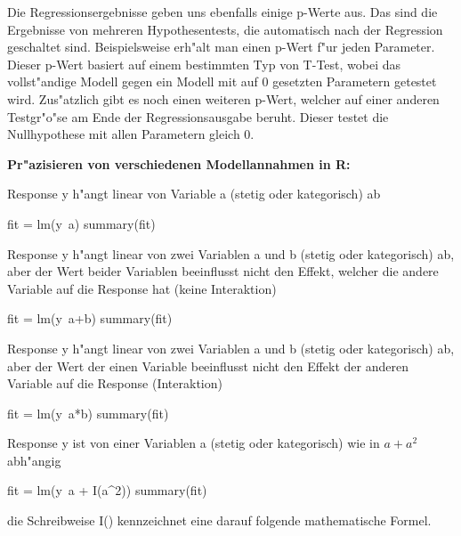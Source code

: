 \documentclass[a4paper,twoside]{tufte-book}\usepackage[]{graphicx}\usepackage[]{color}
\begin{document}
Die Regressionsergebnisse geben uns ebenfalls einige p-Werte aus. Das sind die Ergebnisse von mehreren Hypothesentests, die automatisch nach der Regression geschaltet sind. Beispielsweise erh"alt man einen p-Wert f"ur jeden Parameter. Dieser p-Wert basiert auf einem bestimmten Typ von T-Test, wobei das vollst"andige Modell gegen ein Modell mit auf 0 gesetzten Parametern getestet wird. Zus"atzlich gibt es noch einen weiteren p-Wert, welcher auf einer anderen Testgr"o"se am Ende der Regressionsausgabe beruht. Dieser testet die Nullhypothese mit allen Parametern gleich 0.

\vspace{1cm}
\begin{fullwidth}
\begin{mdframed}
    
\textbf{Pr"azisieren von verschiedenen Modellannahmen in R:} 

Response y h"angt linear von Variable a (stetig oder kategorisch) ab

\begin{Schunk}
\begin{Sinput}
fit = lm(y~a)
summary(fit)
\end{Sinput}
\end{Schunk}

Response y h"angt linear von zwei Variablen a und b (stetig oder kategorisch) ab, aber der Wert beider Variablen beeinflusst nicht den Effekt, welcher die andere Variable auf die Response hat (keine Interaktion)

\begin{Schunk}
\begin{Sinput}
fit = lm(y~a+b)
summary(fit)
\end{Sinput}
\end{Schunk}

Response y h"angt linear von zwei Variablen a und b (stetig oder kategorisch) ab, aber der Wert der einen Variable beeinflusst nicht den Effekt der anderen Variable auf die Response (Interaktion)

\begin{Schunk}
\begin{Sinput}
fit = lm(y~a*b)
summary(fit)
\end{Sinput}
\end{Schunk}

Response y ist von einer Variablen a (stetig oder kategorisch) wie in $a + a^2$ abh"angig

\begin{Schunk}
\begin{Sinput}
fit = lm(y~a + I(a^2))
summary(fit)
\end{Sinput}
\end{Schunk}

die Schreibweise I() kennzeichnet eine darauf folgende mathematische Formel. 

\end{mdframed}
\end{fullwidth}
\end{document}

